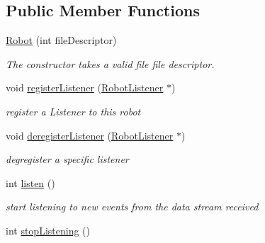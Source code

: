 \subsection*{Public Member Functions}
\begin{DoxyCompactItemize}
\item 
\hypertarget{class_robot_aa23c8bfa375d4f817afd7e2f6ae045f0}{}\hyperlink{class_robot_aa23c8bfa375d4f817afd7e2f6ae045f0}{Robot} (int file\+Descriptor)\label{class_robot_aa23c8bfa375d4f817afd7e2f6ae045f0}

\begin{DoxyCompactList}\small\item\em The constructor takes a valid file file descriptor. \end{DoxyCompactList}\item 
\hypertarget{class_robot_adf034063ea4f50ad8bc80dff10c52fbd}{}void \hyperlink{class_robot_adf034063ea4f50ad8bc80dff10c52fbd}{register\+Listener} (\hyperlink{class_robot_listener}{Robot\+Listener} $\ast$)\label{class_robot_adf034063ea4f50ad8bc80dff10c52fbd}

\begin{DoxyCompactList}\small\item\em register a Listener to this robot \end{DoxyCompactList}\item 
\hypertarget{class_robot_a50bfeaa82bcdae08e2b92c1ab0308e9c}{}void \hyperlink{class_robot_a50bfeaa82bcdae08e2b92c1ab0308e9c}{deregister\+Listener} (\hyperlink{class_robot_listener}{Robot\+Listener} $\ast$)\label{class_robot_a50bfeaa82bcdae08e2b92c1ab0308e9c}

\begin{DoxyCompactList}\small\item\em degregister a specific listener \end{DoxyCompactList}\item 
\hypertarget{class_robot_a6713c453dde16f83b1368fce66130228}{}int \hyperlink{class_robot_a6713c453dde16f83b1368fce66130228}{listen} ()\label{class_robot_a6713c453dde16f83b1368fce66130228}

\begin{DoxyCompactList}\small\item\em start listening to new events from the data stream received \end{DoxyCompactList}\item 
\hypertarget{class_robot_ad0dc163ea28c82cb52ed53e9da913368}{}int \hyperlink{class_robot_ad0dc163ea28c82cb52ed53e9da913368}{stop\+Listening} ()\label{class_robot_ad0dc163ea28c82cb52ed53e9da913368}


\end{DoxyCompactItemize}
